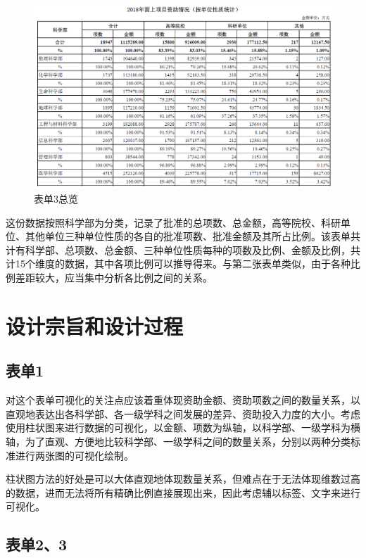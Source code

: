 \documentclass[a4paper,11pt,UTF8]{ctexart}
\begin{document}
\begin{figure}[ht]
\centering
\includegraphics[scale=0.25]{QQ20191028142943.png}
\caption{表单3总览}
\end{figure}

这份数据按照科学部为分类，记录了批准的总项数、总金额，高等院校、科研单位、其他单位三种单位性质的各自的批准项数、批准金额及其所占比例。该表单共计有科学部、总项数、总金额、三种单位性质每种的项数及比例、金额及比例，共计15个维度的数据，其中各项比例可以推导得来。与第二张表单类似，由于各种比例差距较大，应当集中分析各比例之间的关系。

\section{设计宗旨和设计过程}

\subsection{表单1}

对这个表单可视化的关注点应该着重体现资助金额、资助项数之间的数量关系，以直观地表达出各科学部、各一级学科之间发展的差异、资助投入力度的大小。考虑使用柱状图来进行数据的可视化，以金额、项数为纵轴，以科学部、一级学科为横轴，为了直观、方便地比较科学部、一级学科之间的数量关系，分别以两种分类标准进行两张图的可视化绘制。

柱状图方法的好处是可以大体直观地体现数量关系，但难点在于无法体现维数过高的数据，进而无法将所有精确比例直接展现出来，因此考虑辅以标签、文字来进行可视化。

\subsection{表单2、3}
\end{document}
